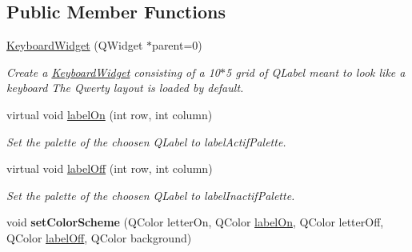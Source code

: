 \subsection*{Public Member Functions}
\begin{DoxyCompactItemize}
\item 
\hyperlink{class_keyboard_widget_ac14f6e0d625237b1e5a34938081fd333}{Keyboard\-Widget} (Q\-Widget $\ast$parent=0)
\begin{DoxyCompactList}\small\item\em Create a \hyperlink{class_keyboard_widget}{Keyboard\-Widget} consisting of a 10$\ast$5 grid of Q\-Label meant to look like a keyboard The Qwerty layout is loaded by default. \end{DoxyCompactList}\item 
virtual void \hyperlink{class_keyboard_widget_aec29dc2f1059798655b028c3c677112a}{label\-On} (int row, int column)
\begin{DoxyCompactList}\small\item\em Set the palette of the choosen Q\-Label to label\-Actif\-Palette. \end{DoxyCompactList}\item 
virtual void \hyperlink{class_keyboard_widget_a20598fb8ae364d5fce74f4299a2d3146}{label\-Off} (int row, int column)
\begin{DoxyCompactList}\small\item\em Set the palette of the choosen Q\-Label to label\-Inactif\-Palette. \end{DoxyCompactList}\item 
\hypertarget{class_keyboard_widget_a06dd2114d263d985e9bb12222d53eea2}{void {\bfseries set\-Color\-Scheme} (Q\-Color letter\-On, Q\-Color \hyperlink{class_keyboard_widget_aec29dc2f1059798655b028c3c677112a}{label\-On}, Q\-Color letter\-Off, Q\-Color \hyperlink{class_keyboard_widget_a20598fb8ae364d5fce74f4299a2d3146}{label\-Off}, Q\-Color background)}\label{class_keyboard_widget_a06dd2114d263d985e9bb12222d53eea2}

\end{DoxyCompactItemize}
